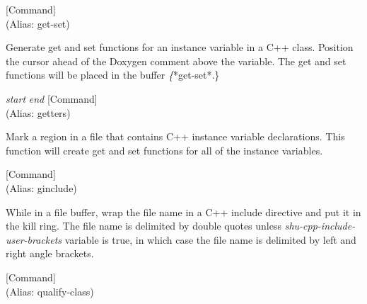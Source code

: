 \vspace{1em}
\noindent
{}
\usebox{\funcname}
 \hfill [Command]\\%
 (Alias: get-set)

\begin{doc-string}
Generate get and set functions for an instance variable in a C++ class.
Position the cursor ahead of the Doxygen comment above the variable.  The get
and set functions will be placed in the buffer \emph\{*get-set*.\}
\end{doc-string}

\vspace{1em}
\noindent
{}
\usebox{\funcname}\emph{start} \emph{end}
 \hfill [Command]\\%
 (Alias: getters)

\begin{doc-string}
Mark a region in a file that contains C++ instance variable declarations.
This function will create get and set functions for all of the instance
variables.
\end{doc-string}

\vspace{1em}
\noindent
{}
\usebox{\funcname}
 \hfill [Command]\\%
 (Alias: ginclude)

\begin{doc-string}
While in a file buffer, wrap the file name in a C++ include directive and
put it in the kill ring.  The file name is delimited by double quotes unless
\emph{shu-cpp-include-user-brackets} variable is true, in which case the file name
is delimited by left and right angle brackets.
\end{doc-string}

\vspace{1em}
\noindent
{}
\usebox{\funcname}
 \hfill [Command]\\%
 (Alias: qualify-class)

